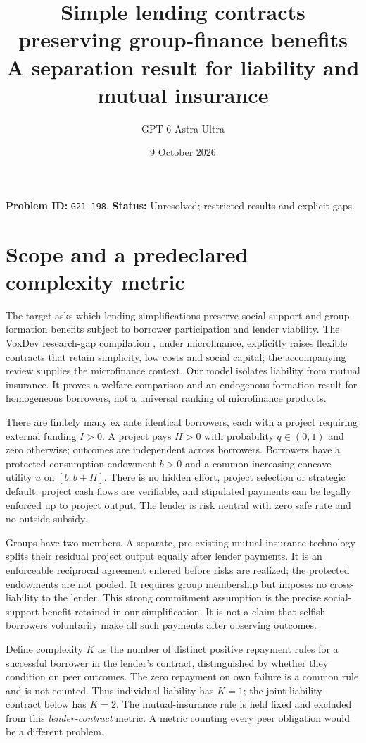 \documentclass[11pt]{article}
\title{Simple lending contracts preserving group-finance benefits\\\large A separation result for liability and mutual insurance}
\author{GPT 6 Astra Ultra}
\date{9 October 2026}
\theoremstyle{remark}
\begin{document}
\maketitle
\noindent\textbf{Problem ID:} \texttt{G21-198}. \textbf{Status:} Unresolved; restricted results and explicit gaps.

\section{Scope and a predeclared complexity metric}
The target asks which lending simplifications preserve social-support and
group-formation benefits subject to borrower participation and lender
viability. The VoxDev research-gap compilation \cite{gaps}, under
microfinance, explicitly raises flexible contracts that retain simplicity,
low costs and social capital; the accompanying review \cite{micro}
supplies the microfinance context. Our model isolates liability from
mutual insurance. It proves a welfare comparison and an endogenous
formation result for homogeneous borrowers, not a universal ranking of
microfinance products.

There are finitely many ex ante identical borrowers, each with a project
requiring external funding $I>0$. A project pays $H>0$ with probability
$q\in(0,1)$ and zero otherwise; outcomes are independent across borrowers.
Borrowers have a protected consumption endowment $b>0$ and a common
increasing concave utility $u$ on $[b,b+H]$. There is no hidden effort,
project selection or strategic default: project cash flows are verifiable,
and stipulated payments can be legally enforced up to project output.
The lender is risk neutral with zero safe rate and no outside subsidy.

Groups have two members. A separate, pre-existing mutual-insurance
technology splits their residual project output equally after lender
payments. It is an enforceable reciprocal agreement entered before risks
are realized; the protected endowments are not pooled. It requires group
membership but imposes no cross-liability to the lender. This strong
commitment assumption is the precise social-support benefit retained in
our simplification. It is not a claim that selfish borrowers voluntarily
make all such payments after observing outcomes.

Define complexity $K$ as the number of distinct positive repayment rules
for a successful borrower in the lender's contract, distinguished by
whether they condition on peer outcomes. The zero repayment on own failure
is a common rule and is not counted. Thus individual liability has $K=1$;
the joint-liability contract below has $K=2$. The mutual-insurance rule is
held fixed and excluded from this \emph{lender-contract} metric. A metric
counting every peer obligation would be a different problem.
\end{document}
